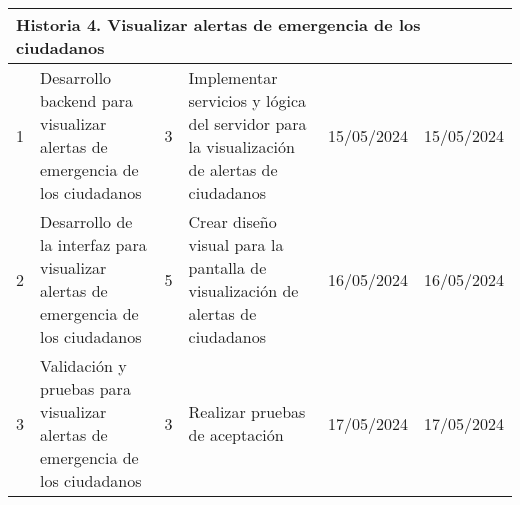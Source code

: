 \begin{longtable}{|p{0.5cm}|p{2cm}|p{1cm}|p{3cm}|p{1cm}|p{1cm}|}
    \multicolumn{6}{|l|}{\textbf{Historia 4. Visualizar alertas de emergencia de los ciudadanos}}                                                                                                                                                                                                                                                                                                                                      \\ \hline
    1                                        & Desarrollo backend para visualizar alertas de emergencia de los ciudadanos        & 3                                                              & Implementar servicios y lógica del servidor para la visualización de alertas de ciudadanos   & 15/05/2024                                                    & 15/05/2024                                                          \\ \hline
    2                                        & Desarrollo de la interfaz para visualizar alertas de emergencia de los ciudadanos & 5                                                              & Crear diseño visual para la pantalla de visualización de alertas de ciudadanos               & 16/05/2024                                                    & 16/05/2024                                                          \\ \hline
    3                                        & Validación y pruebas para visualizar alertas de emergencia de los ciudadanos      & 3                                                              & Realizar pruebas de aceptación                                                               & 17/05/2024                                                    & 17/05/2024                                                          \\ \hline
\end{longtable}